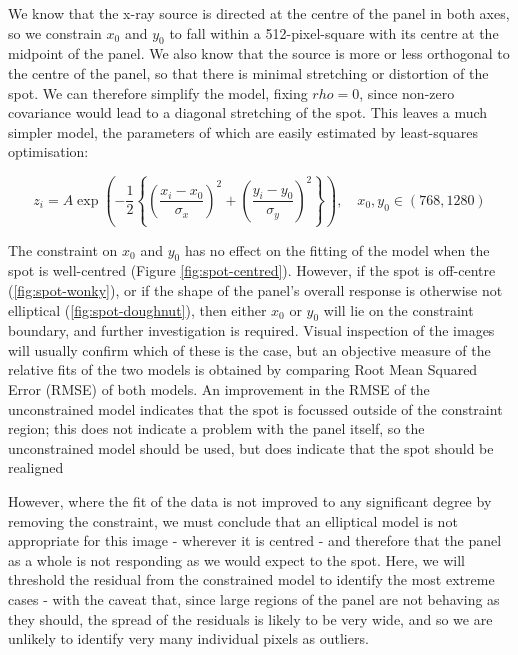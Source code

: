 \documentclass[\main/IO-Pixels.tex]{subfiles}
\begin{document}
We know that the x-ray source is directed at the centre of the panel in both axes, so we constrain $x_0$ and $y_0$ to fall within a 512-pixel-square with its centre at the midpoint of the panel. We also know that the source is more or less orthogonal to the centre of the panel, so that there is minimal stretching or distortion of the spot. We can therefore simplify the model, fixing $rho=0$, since non-zero covariance would lead to a diagonal stretching of the spot. This leaves a much simpler model, the parameters of which are easily estimated by least-squares optimisation:

\begin{equation}
z_i = A \exp \left(-\frac{1}{2} \left\lbrace \left(\frac{x_i - x_0}{\sigma_x}\right)^2 + \left(\frac{y_i - y_0}{\sigma_y}\right)^2 \right\rbrace \right) , \, \, \, \, \, \, x_0, y_0 \in (768, 1280) 
\end{equation}

The constraint on $x_0$ and $y_0$ has no effect on the fitting of the model when the spot is well-centred (Figure \ref{fig:spot-centred}). However, if the spot is off-centre (\ref{fig:spot-wonky}), or if the shape of the panel's overall response is otherwise not elliptical (\ref{fig:spot-doughnut}), then either $x_0$ or $y_0$ will lie on the constraint boundary, and further investigation is required. Visual inspection of the images will usually confirm which of these is the case, but an objective measure of the relative fits of the two models is obtained by comparing Root Mean Squared Error (RMSE) of both models. An improvement in the RMSE of the unconstrained model indicates that the spot is focussed outside of the constraint region; this does not indicate a problem with the panel itself, so the unconstrained model should be used, but does indicate that the spot should be realigned 



However, where the fit of the data is not improved to any significant degree by removing the constraint, we must conclude that an elliptical model is not appropriate for this image - wherever it is centred - and therefore that the panel as a whole is not responding as we would expect to the spot. Here, we will threshold the residual from the constrained model to identify the most extreme cases - with the caveat that, since large regions of the panel are not behaving as they should, the spread of the residuals is likely to be very wide, and so we are unlikely to identify very many individual pixels as outliers. 
\end{document}
